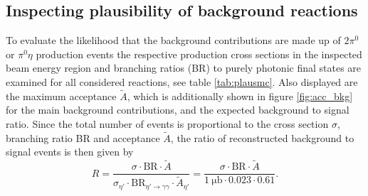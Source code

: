 \subsection{Inspecting plausibility of background reactions}
To evaluate the likelihood that the background contributions are made up of $2\pi^0$ or $\pi^0\eta$ production events the respective production cross sections in the inspected beam energy region and branching ratios (BR) to purely photonic final states are examined for all considered reactions, see table \ref{tab:plausmc}. Also displayed are the maximum acceptance $\tilde{A}$, which is additionally shown in figure \ref{fig:acc_bkg} for the main background contributions, and the expected background to signal ratio. Since the total number of events is proportional to the cross section $\sigma$, branching ratio BR and acceptance $\tilde{A}$, the ratio of reconstructed background to signal events is then given by 
\begin{equation}
	R=\frac{\sigma\cdot\text{BR}\cdot\tilde{A}}{\sigma_{\eta'}\cdot\text{BR}_{\eta'\to\gamma\gamma}\cdot\tilde{A}_{\eta'}}=\frac{\sigma\cdot\text{BR}\cdot\tilde{A}}{\SI{1}{\micro\barn}\cdot0.023\cdot0.61}.
	\label{eq:r}
\end{equation}
